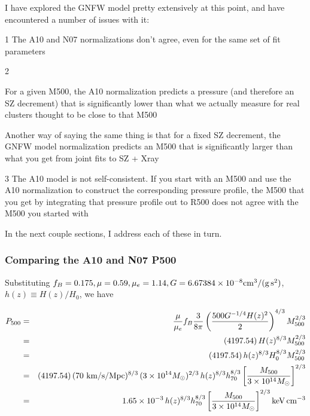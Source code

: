 I have explored the GNFW model pretty extensively at this point, and
have encountered a number of issues with it:

\begin{list}{}{ \leftmargin {} \addtolength{\leftmargin}{\labelsep}}

\item[1] {The A10 and N07 normalizations don't agree, even for the same set of fit parameters}

\item[2] {For a given M500, the A10 normalization predicts a pressure
  (and therefore an SZ decrement) that is significantly lower than
  what we actually measure for real clusters thought to be close to that M500

  Another way of saying the same thing is that for a fixed SZ
  decrement, the GNFW model normalization predicts an M500 that is
  significantly larger than what you get from joint fits to SZ + Xray}

\item[3] {The A10 model is not self-consistent.  If you start with an
  M500 and use the A10 normalization to construct the corresponding
  pressure profile, the M500 that you get by integrating that pressure
  profile out to R500 does not agree with the M500 you started with}

\end{list}

In the next couple sections, I address each of these in turn.

\subsubsection{Comparing the A10 and N07 P500}

Substituting $f_B = 0.175, \mu = 0.59, \mu_e = 1.14, G = 6.67384\times 10^{-8} {\rm cm^{3}/(g\, s^2)}$, $h(z) \equiv H(z) / H_0$, we have

\begin{eqnarray}\nonumber
\P500 &=& {{\mu}\over{\mu_e}} f_B {{3}\over{8\pi}} \left( {{500 G^{-1/4} H(z)^2}\over{2}} \right)^{4/3}\M500^{2/3}\\\nonumber
      &=& (4197.54) \, H(z)^{8/3}\M500^{2/3}\\\nonumber
      &=& (4197.54) \, h(z)^{8/3}H_0^{8/3}\M500^{2/3}\\\nonumber
      &=& (4197.54) \, (70~{\rm km/s/Mpc})^{8/3}\,(3\times10^{14}\Msolar)^{2/3}\,h(z)^{8/3}h_{70}^{8/3}\left[{{\M500}\over{3\times10^{14}\Msolar}}\right]^{2/3}\\
      &=& 1.65\times10^{-3} \, h(z)^{8/3}h_{70}^{8/3}\left[{{\M500}\over{3\times10^{14}\Msolar}}\right]^{2/3} {\rm keV\,cm^{-3}}
\label{eq:arnaud}
\end{eqnarray}

